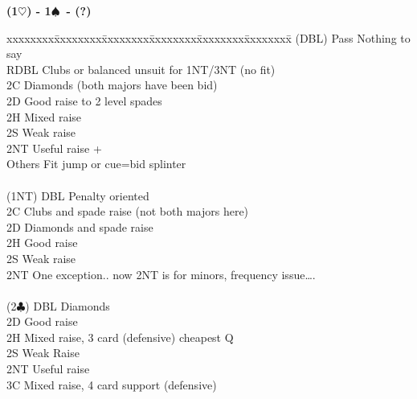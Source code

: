\documentclass[10pt]{article}
\renewcommand{\c}{$\clubsuit$}
\newcommand{\h}{$\heartsuit$}
\newcommand{\s}{$\spadesuit$}
\newcommand{\x}{DBL}
\newenvironment{bidtable}[1][]
{\textbf{#1}
  \begin{adjustwidth}{1em}{}
    \addvspace{2pt}
    \begin{tabbing}
      xxxxxxxx\=xxxxxxxx\=xxxxxxxx\=xxxxxxxx\=xxxxxxxx\=xxxxxxxx\=\kill}
{\end{tabbing}\end{adjustwidth}\bigskip}%
\begin{document}
\begin{multicols*}{2}
\begin{bidtable}[(1\h) - 1\s\ - (?)]
(\x)  \> Pass   \> Nothing to say                                           \\
      \> RDBL   \> Clubs or balanced unsuit for 1NT/3NT (no fit)            \\
      \> 2C     \> Diamonds (both majors have been bid)                     \\
      \> 2D     \> Good raise to 2 level spades                             \\
      \> 2H     \> Mixed raise                                              \\
      \> 2S     \> Weak raise                                               \\
      \> 2NT    \> Useful raise +                                           \\
      \> Others \> Fit jump or cue=bid splinter                             \\
                                                                            \\
(1NT) \> DBL    \> Penalty oriented                                         \\
      \> 2C     \> Clubs and spade raise (not both majors here)             \\
      \> 2D     \> Diamonds and spade raise                                 \\
      \> 2H     \> Good raise                                               \\
      \> 2S     \> Weak raise                                               \\
      \> 2NT    \> One exception.. now 2NT is for minors, frequency issue…. \\
                                                                            \\
(2\c) \> DBL    \> Diamonds                                                 \\
      \> 2D     \> Good raise                                               \\
      \> 2H     \> Mixed raise, 3 card (defensive) cheapest Q               \\
      \> 2S     \> Weak Raise                                               \\
      \> 2NT    \> Useful raise                                             \\
      \> 3C     \> Mixed raise, 4 card support (defensive)                  \\

\end{bidtable}
\end{multicols*}
\end{document}
